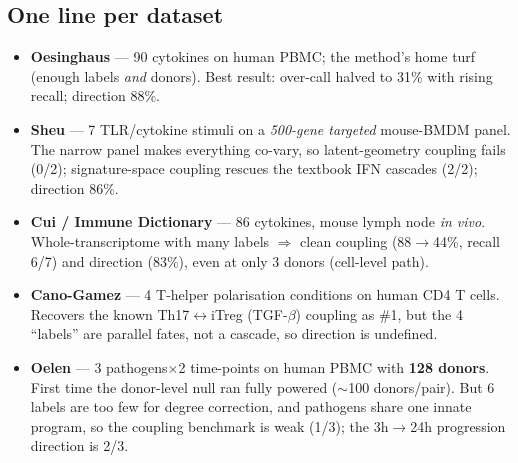 \documentclass[11pt]{article}
\begin{document}
\subsection{One line per dataset}
\begin{itemize}
\item \textbf{Oesinghaus} --- 90 cytokines on human PBMC; the method's home turf (enough labels \emph{and} donors). Best result: over-call halved to 31\% with rising recall; direction 88\%.
\item \textbf{Sheu} --- 7 TLR/cytokine stimuli on a \emph{500-gene targeted} mouse-BMDM panel. The narrow panel makes everything co-vary, so latent-geometry coupling fails (0/2); signature-space coupling rescues the textbook IFN cascades (2/2); direction 86\%.
\item \textbf{Cui / Immune Dictionary} --- 86 cytokines, mouse lymph node \emph{in vivo}. Whole-transcriptome with many labels $\Rightarrow$ clean coupling (88$\to$44\%, recall 6/7) and direction (83\%), even at only 3 donors (cell-level path).
\item \textbf{Cano-Gamez} --- 4 T-helper polarisation conditions on human CD4 T cells. Recovers the known Th17$\leftrightarrow$iTreg (TGF-$\beta$) coupling as \#1, but the 4 ``labels'' are parallel fates, not a cascade, so direction is undefined.
\item \textbf{Oelen} --- 3 pathogens$\times$2 time-points on human PBMC with \textbf{128 donors}. First time the donor-level null ran fully powered ($\sim$100 donors/pair). But 6 labels are too few for degree correction, and pathogens share one innate program, so the coupling benchmark is weak (1/3); the 3h$\to$24h progression direction is 2/3.
\end{itemize}
\end{document}
